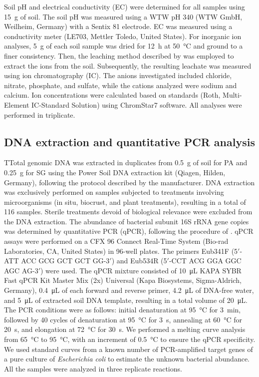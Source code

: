 Soil pH and electrical conductivity (EC) were determined for all samples using \SI{15}{\gram} of soil. The soil pH was measured using a WTW pH 340 (WTW GmbH, Weilheim, Germany) with a Sentix 81 electrode. EC was measured using a conductivity meter (LE703, Mettler Toledo, United States). For inorganic ion analyses, \SI{5}{\gram} of each soil sample was dried for \SI{12}{\hour} at \SI{50}{\degreeCelsius} and ground to a finer consistency. Then, the leaching method described by \citet{Genderjahn2018} was employed to extract the ions from the soil. Subsequently, the resulting leachate was measured using ion chromatography (IC). The anions investigated included chloride, nitrate, phosphate, and sulfate, while the cations analyzed were sodium and calcium. Ion concentrations were calculated based on standards (Roth, Multi-Element IC-Standard Solution) using ChromStar7 software. All analyses were performed in triplicate.

\subsection{DNA extraction and quantitative PCR analysis}

TTotal genomic DNA was extracted in duplicates from \SI{0.5}{\gram} of soil for PA and \SI{0.25}{\gram} for SG using the Power Soil DNA extraction kit (Qiagen, Hilden, Germany), following the protocol described by the manufacturer. DNA extraction was exclusively performed on samples subjected to treatments involving microorganisms (in situ, biocrust, and plant treatments), resulting in a total of 116 samples. Sterile treatments devoid of biological relevance were excluded from the DNA extraction. The abundance of bacterial subunit 16S rRNA gene copies was determined by quantitative PCR (qPCR), following the procedure of \citet{Bernhard2018}. qPCR assays were performed on a CFX 96 Connect Real-Time System (Bio-rad Laboratories, CA, United States) in 96-well plates. The primers Eub341F (5\('\)-ATT ACC GCG GCT GCT GG-3\('\)) and Eub534R (5\('\)-CCT ACG GGA GGC AGC AG-3\('\)) \citep{Muyzer1993} were used. The qPCR mixture consisted of \SI{10}{\micro\liter} KAPA SYBR Fast qPCR Kit Master Mix (2x) Universal (Kapa Biosystems, Sigma-Aldrich, Germany), \SI{0.4}{\micro\liter} of each forward and reverse primer, \SI{4.2}{\micro\liter} of DNA-free water, and \SI{5}{\micro\liter} of extracted soil DNA template, resulting in a total volume of \SI{20}{\micro\liter}. The PCR conditions were as follows: initial denaturation at \SI{95}{\degreeCelsius} for \SI{3}{\minute}, followed by 40 cycles of denaturation at \SI{95}{\degreeCelsius} for \SI{3}{\second}, annealing at \SI{60}{\degreeCelsius} for \SI{20}{\second}, and elongation at \SI{72}{\degreeCelsius} for \SI{30}{\second}. We performed a melting curve analysis from \SI{65}{\degreeCelsius} to \SI{95}{\degreeCelsius}, with an increment of \SI{0.5}{\degreeCelsius} to ensure the qPCR specificity. We used standard curves from a known number of PCR-amplified target genes of a pure culture of \textit{Escherichia coli} to estimate the unknown bacterial abundance. All the samples were analyzed in three replicate reactions.

